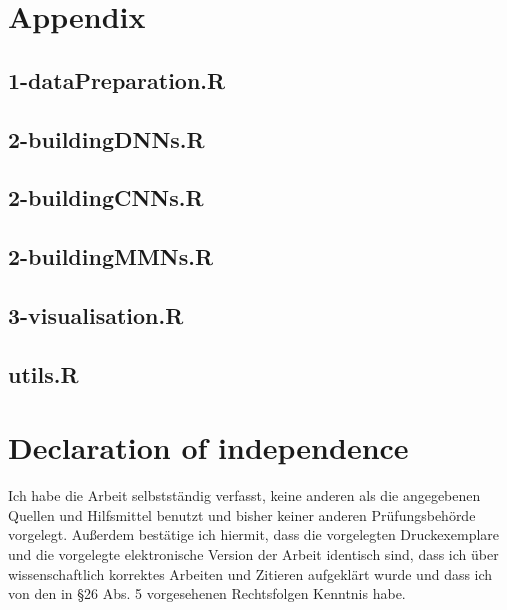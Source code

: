 \documentclass[12pt,twoside]{scrreport}
\begin{document}
\newpage
\renewcommand{\bibname}{References}
 

\chapter*{Appendix}
\lstset{style=Rstyle}
\section*{1-dataPreparation.R}

\newpage
\section*{2-buildingDNNs.R}

\newpage
\section*{2-buildingCNNs.R}

\newpage
\section*{2-buildingMMNs.R}

\newpage
\section*{3-visualisation.R}

\newpage
\section*{utils.R}

\newpage

\chapter*{Declaration of independence}
Ich habe die Arbeit selbstständig verfasst, keine anderen als die angegebenen Quellen und Hilfsmittel benutzt und bisher keiner anderen Prüfungsbehörde vorgelegt. Außerdem bestätige ich hiermit, dass die vorgelegten Druckexemplare und die vorgelegte elektronische Version der Arbeit identisch sind, dass ich über wissenschaftlich korrektes Arbeiten und Zitieren aufgeklärt wurde und dass ich von den in §26 Abs. 5 vorgesehenen Rechtsfolgen Kenntnis habe.
\end{document}
